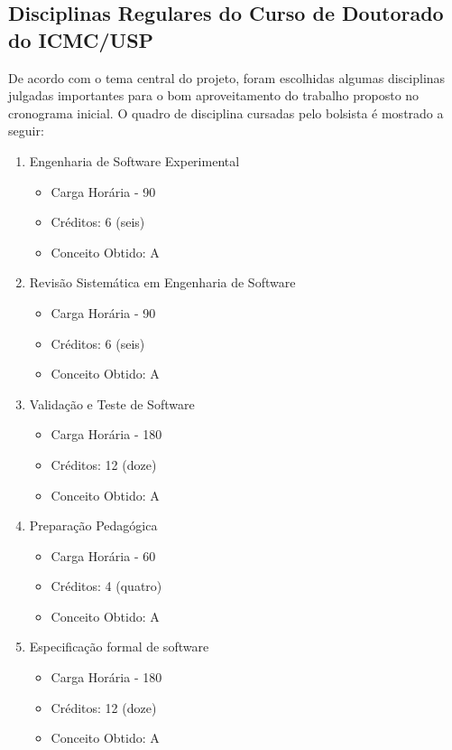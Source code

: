 \subsection{Disciplinas Regulares do Curso de Doutorado do ICMC/USP} %
\label{sub:disciplinas_regulares_do_curso_de_doutorado_do_icmc_usp}

De acordo com o tema central do projeto, foram escolhidas algumas disciplinas julgadas importantes para o bom aproveitamento do trabalho proposto no cronograma inicial. O quadro de disciplina cursadas pelo bolsista é mostrado a seguir:

\begin{enumerate}
	\item Engenharia de Software Experimental
		\begin{itemize}
			\item Carga Horária - 90
			\item Créditos: 6 (seis)
			\item Conceito Obtido: A
		\end{itemize}
	\item Revisão Sistemática em Engenharia de Software
		\begin{itemize}
			\item Carga Horária - 90
			\item Créditos: 6 (seis)
			\item Conceito Obtido: A
		\end{itemize}
	\item Validação e Teste de Software
		\begin{itemize}
			\item Carga Horária - 180
			\item Créditos: 12 (doze)
			\item Conceito Obtido: A
		\end{itemize}
	\item Preparação Pedagógica
		\begin{itemize}
			\item Carga Horária - 60
			\item Créditos: 4 (quatro)
			\item Conceito Obtido: A 
		\end{itemize}
	\item Especificação formal de software
		\begin{itemize}
			\item Carga Horária - 180
			\item Créditos: 12 (doze)
			\item Conceito Obtido: A
		\end{itemize}
\end{enumerate}

